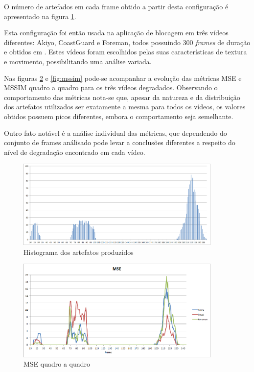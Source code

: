 O número de artefados em cada frame obtido a partir desta configuração é apresentado na figura \ref{fig:histogram}.

Esta configuração foi então usada na aplicação de blocagem em três vídeos diferentes: Akiyo, CoastGuard e Foreman, todos possuindo 300 \emph{frames} de duração e obtidos em \cite{xiph}. Estes vídeos foram escolhidos pelas suas características de textura e movimento, possibilitando uma análise variada.

Nas figuras \ref{fig:mse} e \ref{fig:mssim} pode-se acompanhar a evolução das métricas MSE e MSSIM quadro a quadro para os três vídeos degradados. Observando o comportamento das métricas nota-se que, apesar da natureza e da distribuição dos artefatos utilizados ser exatamente a mesma para todos os vídeos, os valores obtidos possuem picos diferentes, embora o comportamento seja semelhante.

Outro fato notável é a análise individual das métricas, que dependendo do conjunto de frames análisado pode levar a conclusões diferentes a respeito do nível de degradação encontrado em cada vídeo.

\begin{figure}[!htb]
	\centering
	\includegraphics[width=0.9\textwidth]{./imgs/histogram.png}
	\caption{Histograma dos artefatos produzidos}
	\label{fig:histogram}
\end{figure}

\begin{figure}[!htb]
	\centering
	\includegraphics[width=0.9\textwidth]{./imgs/mse.png}
	\caption{MSE quadro a quadro}
	\label{fig:mse}
\end{figure}

